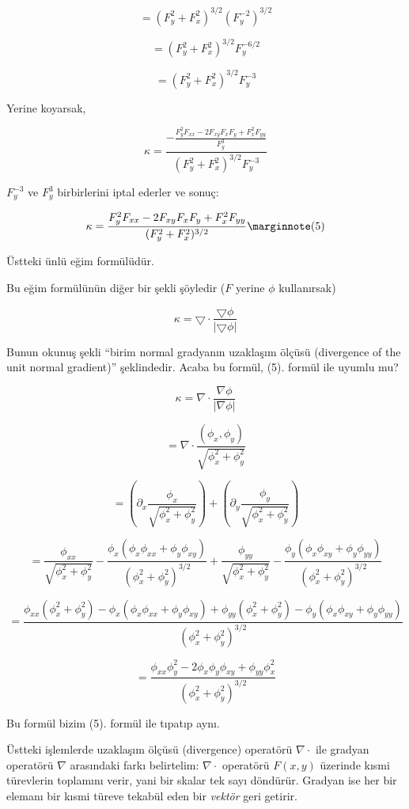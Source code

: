 \documentclass[12pt,fleqn]{article}\usepackage{../../common}
\begin{document}
$$ = (F_y^2 + F_x^2)^{3/2}(F_y^{-2})^{3/2}  $$

$$ = (F_y^2 + F_x^2)^{3/2}F_y^{-6/2}  $$

$$ = (F_y^2 + F_x^2)^{3/2}F_y^{-3} $$

Yerine koyarsak,

$$ 
\kappa = \frac{\displaystyle
- \frac{F_y^2F_{xx} - 2F_{xy}F_xF_y + F_x^2F_{yy}}{F_y^3}}
{(F_y^2 + F_x^2)^{3/2}F_y^{-3}}
 $$

$F_y^{-3}$ ve $F_y^{3}$ birbirlerini iptal ederler ve sonuç:

$$
\kappa = \frac{F_y^2F_{xx} - 2F_{xy}F_xF_y +
    F_x^2F_{yy}}{(F_y^2 + F_x^2)^{3/2}}
\mlabel{5}
$$

Üstteki ünlü eğim  formülüdür. 

Bu eğim formülünün diğer bir şekli şöyledir ($F$ yerine $\phi$ kullanırsak)

$$ \kappa = \bigtriangledown \cdot \frac{\bigtriangledown \phi}{|\bigtriangledown \phi|} $$

Bunun okunuş şekli ``birim normal gradyanın uzaklaşım ölçüsü (divergence of the
unit normal gradient)'' şeklindedir. Acaba bu formül, (5). formül ile
uyumlu mu?

$$ \kappa = \nabla \cdot \frac{\nabla \phi}{|\nabla \phi|}  $$

$$ = \nabla \cdot \frac{(\phi_x,\phi_y)}{\sqrt{\phi_x^2+\phi_y^2}} $$

$$ = \left(\partial_x \frac{\phi_x}{\sqrt{\phi_x^2+\phi_y^2}}\right)+ 
\left(\partial_y \frac{\phi_y}{\sqrt{\phi_x^2+\phi_y^2}}\right)  $$

$$ = \frac{\phi_{xx}}{\sqrt{\phi_x^2+\phi_y^2}} - \frac{\phi_x (\phi_x\phi_{xx}+\phi_y\phi_{xy})}
{(\phi_x^2+\phi_y^2)^{3/2}} +
\frac{\phi_{yy}}{\sqrt{\phi_x^2+\phi_y^2}} - \frac{\phi_y(\phi_x\phi_{xy}+\phi_y\phi_{yy})}
{(\phi_x^2+\phi_y^2)^{3/2}}  $$

$$ = \frac{\phi_{xx}(\phi_x^2+\phi_y^2) - \phi_x
  (\phi_x\phi_{xx}+\phi_y\phi_{xy}) +\phi_{yy}(\phi_x^2+\phi_y^2) -
  \phi_y(\phi_x\phi_{xy}+\phi_y\phi_{yy})}{(\phi_x^2+\phi_y^2)^{3/2}} $$

$$ = \frac{\phi_{xx}\phi_y^2 - 2\phi_x\phi_y\phi_{xy} + \phi_{yy}\phi_x^2}{(\phi_x^2+\phi_y^2)^{3/2}}  $$

Bu formül bizim (5). formül ile tıpatıp aynı.

Üstteki işlemlerde uzaklaşım ölçüsü (divergence) operatörü $\nabla \cdot$
ile gradyan operatörü $\nabla$ arasındaki farkı belirtelim: $\nabla \cdot$
operatörü $F(x,y)$ üzerinde kısmi türevlerin toplamını verir, yani bir
skalar tek sayı döndürür. Gradyan ise her bir elemanı bir kısmi türeve
tekabül eden bir {\em vektör} geri getirir.
\end{document}
